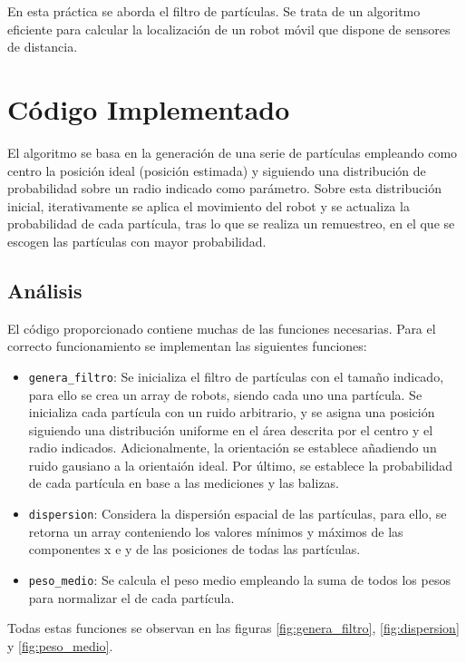 En esta práctica se aborda el filtro de partículas. Se trata de un algoritmo eficiente para calcular la localización de un robot móvil que dispone de sensores de distancia.

\section{Código Implementado}
El algoritmo se basa en la generación de una serie de partículas empleando como centro la posición ideal (posición estimada) y siguiendo una distribución de probabilidad
sobre un radio indicado como parámetro. Sobre esta distribución inicial, iterativamente se aplica el movimiento del robot y se actualiza la probabilidad de cada partícula, 
tras lo que se realiza un remuestreo, en el que se escogen las partículas con mayor probabilidad.


\subsection{Análisis}
El código proporcionado contiene muchas de las funciones necesarias. Para el correcto funcionamiento se implementan las siguientes funciones:
\begin{itemize}
  \item \texttt{genera\_filtro}: Se inicializa el filtro de partículas con el tamaño indicado, para ello se crea un array de robots, siendo
cada uno una partícula. Se inicializa cada partícula con un ruido arbitrario, y se asigna una posición siguiendo una distribución uniforme en el área
descrita por el centro y el radio indicados. Adicionalmente, la orientación se establece añadiendo un ruido gausiano a la orientaión ideal. Por último,
se establece la probabilidad de cada partícula en base a las mediciones y las balizas.
  \item \texttt{dispersion}: Considera la dispersión espacial de las partículas, para ello, se retorna un array conteniendo los valores mínimos y máximos de las componentes x e y de las posiciones de todas las partículas.
  \item \texttt{peso\_medio}: Se calcula el peso medio empleando la suma de todos los pesos para normalizar el de cada partícula.
\end{itemize}
Todas estas funciones se observan en las figuras \ref{fig:genera_filtro}, \ref{fig:dispersion} y \ref{fig:peso_medio}.

